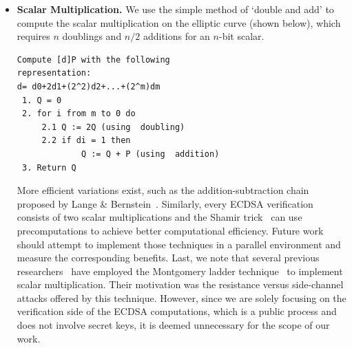 \documentclass[11pt,twocolumn]{IEEEtran}
\begin{document}
\begin{itemize}
\begin{verbatim}
\end{verbatim}

\normalsize
\emph{Doubling formula:}
\small
\begin{verbatim}
(X3,Y3,Z3)=[2](X1,Y1,Z1)

w = 3*(X1-Z1)*(X1+Z1)
      s = 2*Y1*Z1
      ss = s2
      sss = s*ss
      R = Y1*s
      RR = R2
      B = 2*X1*R
      h = w2-2*B
      X3 = h*s
      Y3 = w*(B-h)-2*RR
      Z3 = sss

\end{verbatim}
\normalsize
\item \textbf{Scalar Multiplication.} We use the simple method of `double and add' to compute the scalar multiplication on the elliptic curve (shown below), which requires $n$ doublings and $n/2$ additions for an $n$-bit  scalar.\\
\small
\begin{verbatim}
Compute [d]P with the following
representation: 
d= d0+2d1+(2^2)d2+...+(2^m)dm
 1. Q = 0
 2. for i from m to 0 do
     2.1 Q := 2Q (using  doubling)
     2.2 if di = 1 then
	         Q := Q + P (using  addition)
 3. Return Q
\end{verbatim}
\normalsize
More efficient variations exist, such as the addition-subtraction chain proposed by Lange \& Bernstein~\cite{scalar}. Similarly, every ECDSA verification consists of two scalar multiplications and the Shamir trick~\cite{trick} can use precomputations to achieve better computational efficiency. Future work should attempt to implement those techniques in a parallel environment and measure the corresponding benefits. Last, we note that several previous researchers~\cite{bos,fischer,antao} have employed the Montgomery ladder technique~\cite{ladder} to implement scalar multiplication. Their motivation was the resistance versus side-channel attacks offered by this technique. However, since we are solely focusing on the verification side of the ECDSA computations, which is a public process and does not involve secret keys, it is deemed unnecessary for the scope of our work. 
\end{itemize}
\end{document}
